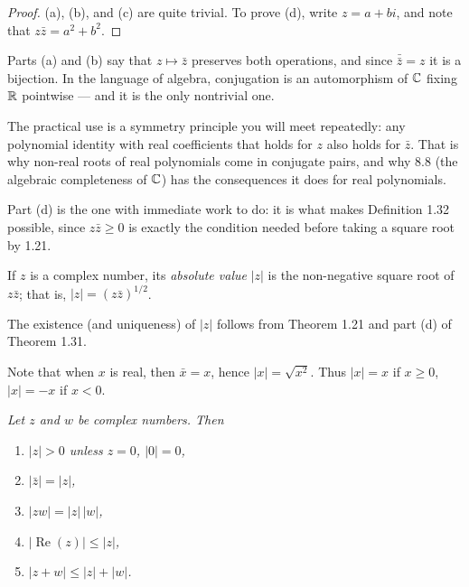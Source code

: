 \begin{proof}
(a), (b), and (c) are quite trivial. To prove (d), write $z = a+bi$, and note
that $z\bar z = a^2+b^2$.
\end{proof}

\begin{deeper}
Parts (a) and (b) say that $z \mapsto \bar z$ preserves both operations, and
since $\bar{\bar z} = z$ it is a bijection. In the language of algebra,
conjugation is an automorphism of $\mathbb{C}$ fixing $\mathbb{R}$ pointwise --- and it is the
only nontrivial one.

The practical use is a symmetry principle you will meet repeatedly: any
polynomial identity with real coefficients that holds for $z$ also holds for
$\bar z$. That is why non-real roots of real polynomials come in conjugate
pairs, and why 8.8 (the algebraic completeness of $\mathbb{C}$) has the consequences it
does for real polynomials.

Part (d) is the one with immediate work to do: it is what makes Definition 1.32
possible, since $z\bar z \ge 0$ is exactly the condition needed before taking a
square root by 1.21.
\end{deeper}

If $z$ is a complex number, its \emph{absolute value} $|z|$ is the non-negative
square root of $z\bar z$; that is, $|z| = (z\bar z)^{1/2}$.

The existence (and uniqueness) of $|z|$ follows from Theorem 1.21 and part (d)
of Theorem 1.31.

Note that when $x$ is real, then $\bar x = x$, hence $|x| = \sqrt{x^2}$. Thus
$|x| = x$ if $x \ge 0$, $|x| = -x$ if $x < 0$.

\emph{Let $z$ and $w$ be complex numbers. Then}
\begin{enumerate}[label=(\alph*), leftmargin=2.2em, itemsep=1pt, topsep=3pt]
  \item \emph{$|z| > 0$ unless $z = 0$, $|0| = 0$,}
  \item \emph{$|\bar z| = |z|$,}
  \item \emph{$|zw| = |z|\,|w|$,}
  \item \emph{$|\operatorname{Re}(z)| \le |z|$,}
  \item \emph{$|z+w| \le |z|+|w|$.}
\end{enumerate}

